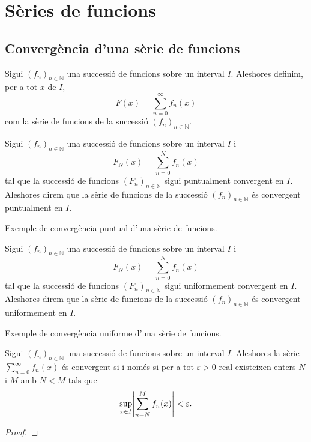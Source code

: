 \documentclass[../Apunts.tex]{subfiles}
\begin{document}
\section{Sèries de funcions}
	\subsection{Convergència d'una sèrie de funcions}
	\begin{definition}
		Sigui \((f_{n})_{n\in\mathbb{N}}\) una successió de funcions sobre un interval \(I\). Aleshores definim, per a tot \(x\) de \(I\),
		\[F(x)=\sum_{n=0}^{\infty}f_{n}(x)\]
		com la sèrie de funcions de la successió \((f_{n})_{n\in\mathbb{N}}\).
	\end{definition}
	\begin{definition}
		\label{def:convergència puntual d'una sèrie de funcions}
		Sigui \((f_{n})_{n\in\mathbb{N}}\) una successió de funcions sobre un interval \(I\) i
		\[F_{N}(x)=\sum_{n=0}^{N}f_{n}(x)\]
		tal que la successió de funcions \((F_{n})_{n\in\mathbb{N}}\) sigui puntualment convergent en \(I\). Aleshores direm que la sèrie de funcions de la successió \((f_{n})_{n\in\mathbb{N}}\) és convergent puntualment en \(I\).
	\end{definition}
	\begin{example}
		Exemple de convergència puntual d'una sèrie de funcions.
		\begin{solution}
		\end{solution}
	\end{example}
	\begin{definition}
		\label{def:convergència uniforme d'una sèrie de funcions}
		Sigui \((f_{n})_{n\in\mathbb{N}}\) una successió de funcions sobre un interval \(I\) i
		\[F_{N}(x)=\sum_{n=0}^{N}f_{n}(x)\]
		tal que la successió de funcions \((F_{n})_{n\in\mathbb{N}}\) sigui uniformement convergent en \(I\). Aleshores direm que la sèrie de funcions de la successió \((f_{n})_{n\in\mathbb{N}}\) és convergent uniformement en \(I\).
	\end{definition}
	\begin{example}
		Exemple de convergència uniforme d'una sèrie de funcions.
		\begin{solution}
		\end{solution}
	\end{example}
	\begin{theorem}
		\label{def:condició de Cauchy per sèries de funcions}
		Sigui \((f_{n})_{n\in\mathbb{N}}\) una successió de funcions sobre un interval \(I\). Aleshores la sèrie \(\sum_{n=0}^{\infty}f_{n}(x)\) és convergent si i només si per a tot \(\varepsilon>0\) real existeixen enters \(N\) i \(M\) amb \(N<M\) tals que
		\[\sup_{x\in I}\abs{\sum_{n=N}^{M}f_{n}(x)}<\varepsilon.\]
		\begin{proof}
		\end{proof}
	\end{theorem}
\end{document}
